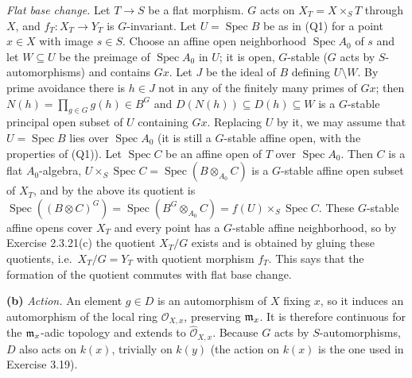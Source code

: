 \documentclass[11pt]{article}
\begin{document}
\emph{Flat base change.} Let $T\to S$ be a flat morphism. $G$ acts on $X_T=X\times_ST$ through $X$, and $f_T:X_T\to Y_T$ is $G$-invariant. Let $U=\operatorname{Spec}B$ be as in (Q1) for a point $x\in X$ with image $s\in S$. Choose an affine open neighborhood $\operatorname{Spec}A_0$ of $s$ and let $W\subseteq U$ be the preimage of $\operatorname{Spec}A_0$ in $U$; it is open, $G$-stable ($G$ acts by $S$-automorphisms) and contains $Gx$. Let $J$ be the ideal of $B$ defining $U\setminus W$. By prime avoidance there is $h\in J$ not in any of the finitely many primes of $Gx$; then $N(h)=\prod_{g\in G}g(h)\in B^G$ and $D(N(h))\subseteq D(h)\subseteq W$ is a $G$-stable principal open subset of $U$ containing $Gx$. Replacing $U$ by it, we may assume that $U=\operatorname{Spec}B$ lies over $\operatorname{Spec}A_0$ (it is still a $G$-stable affine open, with the properties of (Q1)). Let $\operatorname{Spec}C$ be an affine open of $T$ over $\operatorname{Spec}A_0$. Then $C$ is a flat $A_0$-algebra, $U\times_S\operatorname{Spec}C=\operatorname{Spec}(B\otimes_{A_0}C)$ is a $G$-stable affine open subset of $X_T$, and by the above its quotient is $\operatorname{Spec}((B\otimes C)^G)=\operatorname{Spec}(B^G\otimes_{A_0}C)=f(U)\times_S\operatorname{Spec}C$. These $G$-stable affine opens cover $X_T$ and every point has a $G$-stable affine neighborhood, so by Exercise 2.3.21(c) the quotient $X_T/G$ exists and is obtained by gluing these quotients, i.e.\ $X_T/G=Y_T$ with quotient morphism $f_T$. This says that the formation of the quotient commutes with flat base change.

\textbf{(b)} \emph{Action.} An element $g\in D$ is an automorphism of $X$ fixing $x$, so it induces an automorphism of the local ring $\mathcal O_{X,x}$, preserving $\mathfrak m_x$. It is therefore continuous for the $\mathfrak m_x$-adic topology and extends to $\widehat{\mathcal O}_{X,x}$. Because $G$ acts by $S$-automorphisms, $D$ also acts on $k(x)$, trivially on $k(y)$ (the action on $k(x)$ is the one used in Exercise 3.19).
\end{document}
